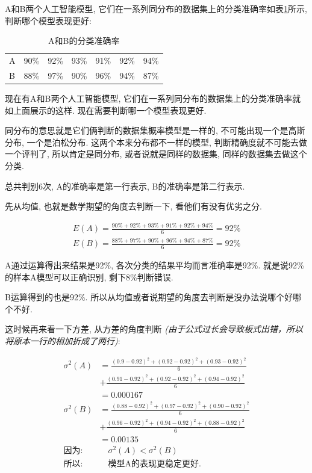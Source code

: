 A和B两个人工智能模型, 它们在一系列同分布的数据集上的分类准确率如表\ref{fig:table5_1}所示, 判断哪个模型表现更好:

\begin{table}[ht]
  \centering
  \begin{tabular}{lllllll}
  \midrule
    A & 90\% & 92\% & 93\% & 91\% & 92\% & 94\%\\
    B & 88\% & 97\% & 90\% & 96\% & 94\% & 87\%\\
  \bottomrule
  \end{tabular}
  \caption{A和B的分类准确率}
  \label{fig:table5_1}
\end{table}

现在有A和B两个人工智能模型, 它们在一系列同分布的数据集上的分类准确率就如上面展示的这样. 现在需要判断哪一个模型表现更好. 

同分布的意思就是它们俩判断的数据集概率模型是一样的, 不可能出现一个是高斯分布, 一个是泊松分布. 这两个本来分布都不一样的模型, 判断精确度就不可能去做一个评判了, 所以肯定是同分布, 或者说就是同样的数据集, 同样的数据集去做这个分类. 

总共判别6次, A的准确率是第一行表示, B的准确率是第二行表示. 

先从均值, 也就是数学期望的角度去判断一下, 看他们有没有优劣之分. 

\begin{align*}
  E(A) = \frac{90\% + 92\% + 93\% + 91\% + 92\% + 94\%}{6} = 92\% \\
  E(B) = \frac{88\% + 97\% + 90\% + 96\% + 94\% + 87\%}{6} = 92\%
\end{align*}

A通过运算得出来结果是92\%, 各次分类的结果平均而言准确率是92\%. 就是说92\%的样本A模型可以正确识别, 剩下8\%判断错误. 

B运算得到的也是92\%. 所以从均值或者说期望的角度去判断是没办法说哪个好哪个不好. 

这时候再来看一下方差, 从方差的角度判断 \textit{(由于公式过长会导致板式出错，所以将原本一行的相加折成了两行)}:

\begin{align*}
  \sigma^2(A) & = \frac{(0.9-0.92)^2 + (0.92-0.92)^2 + (0.93-0.92)^2}{6} \\ & + \frac{(0.91-0.92)^2 + (0.92-0.92)^2 + (0.94-0.92)^2}{6} \\ 
  & = 0.000167 \\
  \sigma^2(B) & = \frac{(0.88-0.92)^2 + (0.97-0.92)^2 + (0.90-0.92)^2}{6} \\ & + \frac{(0.96-0.92)^2 + (0.94-0.92)^2 + (0.88-0.92)^2}{6} \\
  & = 0.00135 \\ 
  \mbox{因为}: & \quad  \sigma^2(A) < \sigma^2(B) \\
  \mbox{所以}: & \quad \mbox{模型A的表现更稳定更好. }
\end{align*}

